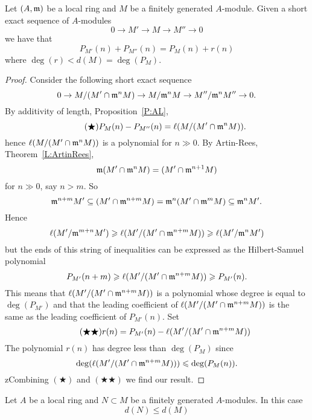 \documentclass{ximera}
\begin{document}
\begin{proposition}\label{P:AddHS}
  Let $(A,\mathfrak{m})$ be a local ring and $M$ be a finitely generated
  $A$-module. Given a short exact sequence of $A$-modules
  \[
  0\to M' \to M\to M'' \to 0
  \]
  we have that
  \[
  P_{M'}(n) + P_{M''}(n) = P_M(n) +r(n)
  \]
  where $\deg(r)< d(M) = \deg(P_M)$.
  \begin{proof}
    Consider the following short exact sequence
    \[
    0 \to M/(M'\cap \mathfrak{m}^n M) \to M/\mathfrak{m}^n M \to M''/\mathfrak{m}^n M'' \to 0.
    \]
    By additivity of length, Proposition~\ref{P:AL},
    \[\tag{$\bigstar$}
    P_M(n) - P_{M''}(n)  = \ell(M/(M'\cap \mathfrak{m}^n M)).
    \]
    hence $\ell(M/(M'\cap \mathfrak{m}^n M))$ is a polynomial for $n\gg 0$. By
    Artin-Rees, Theorem~\ref{L:ArtinRees}, 
    \[
    \mathfrak{m} (M'\cap \mathfrak{m}^n M) = (M'\cap \mathfrak{m}^{n+1} M)
    \]
    for $n\gg 0$, say $n>m$.  So
    \[
    \mathfrak{m}^{n+m} M' \subseteq (M'\cap \mathfrak{m}^{n+m}M)  = \mathfrak{m}^n (M'\cap\mathfrak{m}^m M)\subseteq \mathfrak{m}^n M'.
    \]
    Hence
    \[
    \ell(M'/\mathfrak{m}^{m+n}M')\geqslant \ell(M'/(M'\cap \mathfrak{m}^{n+m}M))\geqslant \ell(M'/\mathfrak{m}^n M')
    \]
    but the ends of this string of inequalities can be expressed as
    the Hilbert-Samuel polynomial
    \[
    P_{M'}(n+m) \geqslant \ell(M'/(M'\cap \mathfrak{m}^{n+m}M)) \geqslant P_{M'}(n).
    \]
    This means that $\ell(M'/(M'\cap \mathfrak{m}^{n+m}M))$ is a polynomial whose
    degree is equal to $\deg(P_{M'})$ and that the leading coefficient
    of $\ell(M'/(M'\cap \mathfrak{m}^{n+m}M))$ is the same as the leading
    coefficient of $P_{M'}(n)$. Set
    \[\tag{$\bigstar\bigstar$}
    r(n) = P_{M'}(n) -\ell(M'/(M'\cap \mathfrak{m}^{n+m}M))
    \]
    The polynomial $r(n)$ has degree less than $\deg(P_{M})$ since
    \[
    \deg(\ell(M'/(M'\cap \mathfrak{m}^{n+m}M)))\leqslant \deg(P_M(n)).
    \]
    zCombining $(\bigstar)$ and $(\bigstar\bigstar)$ we find our
    result.
  \end{proof}
\end{proposition}


\begin{corollary}\label{C:sub}
  Let $A$ be a local ring and $N\subset M$ be a finitely generated
  $A$-modules. In this case
  \[
  d(N) \le d(M)
  \]
\end{corollary}
\end{document}
